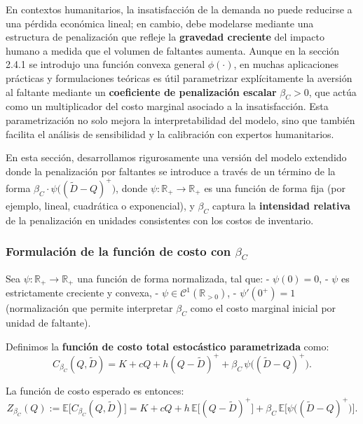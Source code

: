 \documentclass[
  spanish,
  us-letterpaper,
  DIV=11,
  numbers=noendperiod]{scrreprt}
\numberwithin{equation}{section}
\begin{document}
En contextos humanitarios, la insatisfacción de la demanda no puede
reducirse a una pérdida económica lineal; en cambio, debe modelarse
mediante una estructura de penalización que refleje la \textbf{gravedad
creciente} del impacto humano a medida que el volumen de faltantes
aumenta. Aunque en la sección 2.4.1 se introdujo una función convexa
general \(\phi(\cdot)\), en muchas aplicaciones prácticas y
formulaciones teóricas es útil parametrizar explícitamente la aversión
al faltante mediante un \textbf{coeficiente de penalización escalar}
\(\beta_C > 0\), que actúa como un multiplicador del costo marginal
asociado a la insatisfacción. Esta parametrización no solo mejora la
interpretabilidad del modelo, sino que también facilita el análisis de
sensibilidad y la calibración con expertos humanitarios.

En esta sección, desarrollamos rigurosamente una versión del modelo
extendido donde la penalización por faltantes se introduce a través de
un término de la forma
\(\beta_C \cdot \psi\big((\tilde{D} - Q)^+\big)\), donde
\(\psi: \mathbb{R}_+ \to \mathbb{R}_+\) es una función de forma fija
(por ejemplo, lineal, cuadrática o exponencial), y \(\beta_C\) captura
la \textbf{intensidad relativa} de la penalización en unidades
consistentes con los costos de inventario.

\subsubsection{\texorpdfstring{Formulación de la función de costo con
\(\beta_C\)}{Formulación de la función de costo con \textbackslash beta\_C}}\label{formulaciuxf3n-de-la-funciuxf3n-de-costo-con-beta_c}

Sea \(\psi: \mathbb{R}_+ \to \mathbb{R}_+\) una función de forma
normalizada, tal que: - \(\psi(0) = 0\), - \(\psi\) es estrictamente
creciente y convexa, - \(\psi \in \mathcal{C}^1(\mathbb{R}_{>0})\), -
\(\psi'(0^+) = 1\) (normalización que permite interpretar \(\beta_C\)
como el costo marginal inicial por unidad de faltante).

Definimos la \textbf{función de costo total estocástico parametrizada}
como: \[
C_{\beta_C}(Q, \tilde{D}) = K + c Q + h (Q - \tilde{D})^+ + \beta_C \, \psi\big((\tilde{D} - Q)^+\big).
\]

La función de costo esperado es entonces: \[
Z_{\beta_C}(Q) := \mathbb{E}\big[ C_{\beta_C}(Q, \tilde{D}) \big] = K + c Q + h \, \mathbb{E}\big[(Q - \tilde{D})^+\big] + \beta_C \, \mathbb{E}\Big[\psi\big((\tilde{D} - Q)^+\big)\Big].
\]
\end{document}

